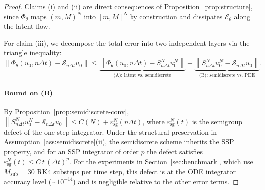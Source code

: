 \documentclass[hidelinks,review,nohypdvips,onefignum,onetabnum]{siamart220329}
\newcommand{\cS}{\mathcal{S}}
\newcommand{\cE}{\mathcal{E}}
\newcommand{\PhiT}{\Phi_{\theta}}
\newcommand{\norm}[1]{\left\lVert #1 \right\rVert}
\begin{document}
\begin{proof}
Claims (i) and (ii) are direct consequences of Proposition~\ref{prop:structure}, since $\PhiT$ maps $(m,M)^N$ into $[m,M]^N$ by construction and dissipates $\cE_{\theta}$ along the latent flow.

For claim (iii), we decompose the total error into two independent layers via the triangle inequality:
\begin{equation}\label{eq:transfer-decomp}
\norm{\PhiT(u_0,n\Delta t)-\cS_{n\Delta t}u_0}\le \underbrace{\norm{\PhiT(u_0,n\Delta t)-S_{n\Delta t}^Nu_0^N}}_{\text{(A): latent vs.\ semidiscrete}}+\underbrace{\norm{S_{n\Delta t}^Nu_0^N-\cS_{n\Delta t}u_0}}_{\text{(B): semidiscrete vs.\ PDE}}.
\end{equation}

\paragraph{Bound on (B).} By Proposition~\ref{prop:semidiscrete-conv}, $\norm{S_{n\Delta t}^Nu_0^N-\cS_{n\Delta t}u_0}\le C(N)+\varepsilon_{\mathrm{sg}}^N(n\Delta t)$, where $\varepsilon_{\mathrm{sg}}^N(t)$ is the semigroup defect of the one-step integrator. Under the structural preservation in Assumption~\ref{ass:semidiscrete}(ii), the semidiscrete scheme inherits the SSP property, and for an SSP integrator of order $p$ the defect satisfies $\varepsilon_{\mathrm{sg}}^N(t)\le C\,t\,(\Delta t)^p$. For the experiments in Section~\ref{sec:benchmark}, which use $M_{\mathrm{sub}}=30$ RK4 substeps per time step, this defect is at the ODE integrator accuracy level ($\sim10^{-14}$) and is negligible relative to the other error terms.


\end{proof}
\end{document}
